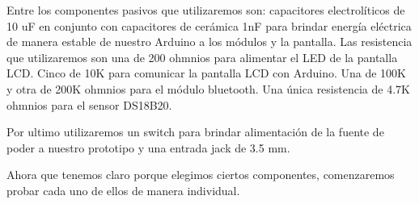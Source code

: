 \par \noindent
Entre los componentes pasivos que utilizaremos son: capacitores electrolíticos de 10 uF en conjunto con capacitores de cerámica 1nF para brindar energía eléctrica de manera estable de nuestro Arduino a los módulos y la pantalla. Las resistencia que utilizaremos son una de 200 ohmnios para alimentar el LED de la pantalla LCD. Cinco de 10K para comunicar la pantalla LCD con Arduino. Una de 100K y otra de 200K ohmnios para el módulo bluetooth. Una única resistencia de 4.7K ohmnios para el sensor DS18B20.

\clearpage

\noindent
Por ultimo utilizaremos un switch para brindar alimentación de la fuente de poder a nuestro prototipo y una entrada jack de 3.5 mm.

\par \noindent
Ahora que tenemos claro porque elegimos ciertos componentes, comenzaremos probar cada uno de ellos de manera individual.
 
